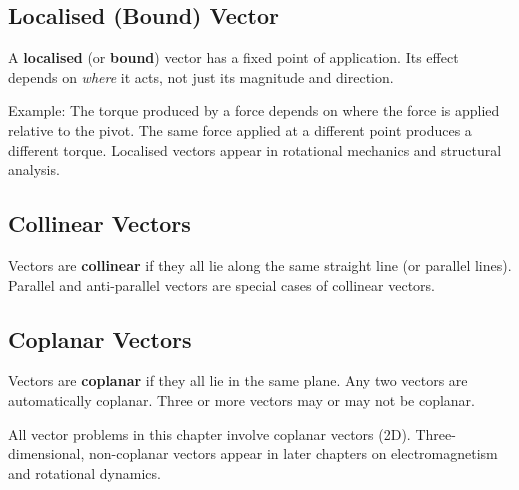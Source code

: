 \subsection*{Localised (Bound) Vector}

\begin{definitionbox}
A \textbf{localised} (or \textbf{bound}) vector has a
fixed point of application. Its effect depends on
\textit{where} it acts, not just its magnitude and
direction.
\end{definitionbox}

\noindent Example: The torque produced by a force
depends on where the force is applied relative to
the pivot. The same force applied at a different
point produces a different torque. Localised vectors
appear in rotational mechanics and structural analysis.

\subsection*{Collinear Vectors}

\begin{definitionbox}
Vectors are \textbf{collinear} if they all lie along the
same straight line (or parallel lines). Parallel and
anti-parallel vectors are special cases of collinear
vectors.
\end{definitionbox}

\subsection*{Coplanar Vectors}

\begin{definitionbox}
Vectors are \textbf{coplanar} if they all lie in the
same plane. Any two vectors are automatically coplanar.
Three or more vectors may or may not be coplanar.
\end{definitionbox}

\noindent All vector problems in this chapter involve
coplanar vectors (2D). Three-dimensional, non-coplanar
vectors appear in later chapters on electromagnetism
and rotational dynamics.

